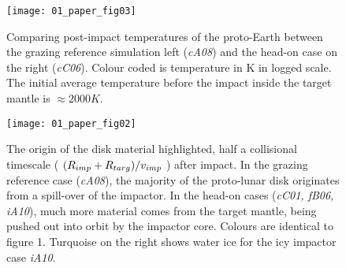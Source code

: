\begin{figure}
\begin{center}
\texttt{[image: 01\_paper\_fig03]}
\caption{Comparing post-impact temperatures of the proto-Earth between the grazing reference simulation left (\emph{cA08}) and the head-on case on the right (\emph{cC06}). Colour coded is temperature in K in logged scale. The initial average temperature before the impact inside the target mantle is $\approx 2000 K$.}
\label{ch05_fig01c}
\end{center}
\end{figure}

\begin{figure}
\begin{center}
\texttt{[image: 01\_paper\_fig02]}
\caption{The origin of the disk material highlighted, half a collisional timescale ( $ (R_{imp} + R_{targ}) / v_{imp}$ ) after impact. In the grazing reference case (\emph{cA08}), the majority of the proto-lunar disk originates from a spill-over of the impactor. In the head-on cases (\emph{cC01, fB06, iA10}), much more material comes from the target mantle, being pushed out into orbit by the impactor core. Colours are
identical to figure 1. Turquoise on the right shows water ice for the icy impactor case \emph{iA10}.}
\label{ch05_fig01b}
\end{center}
\end{figure}









